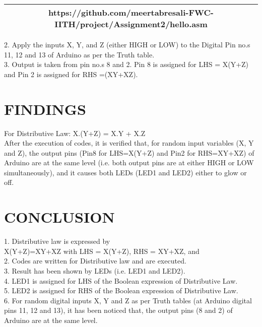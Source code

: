 \documentclass[conference]{IEEEtran}
\begin{document}
\begin{table}[h]
\centering
\begin{tabular}{| c |} \hline
 \rule{0pt}{20pt} https://github.com/meertabresali-FWC-IITH/project/Assignment2/hello.asm\\\hline
\end{tabular}
\end{table}
\begin{flushleft}
2. Apply the inputs X, Y, and Z (either HIGH or LOW) to the Digital Pin no.s 11, 12 and 13 of Arduino as per the Truth table.\\
\vspace{0.4cm}
3. Output is taken from pin no.s 8 and 2. Pin 8 is assigned for LHS = X(Y+Z) and Pin 2 is assigned for RHS =(XY+XZ). 
\end{flushleft}

\section{FINDINGS}
\begin{flushleft}
For Distributive Law: X.(Y+Z) = X.Y + X.Z \\
\vspace{0.3cm}
After the execution of codes, it is verified that, for random input variables (X, Y and Z), the output pins (Pin8 for LHS=X(Y+Z) and Pin2 for RHS=XY+XZ) of Arduino are at the same level (i.e. both output pins are at either HIGH or LOW simultaneously), and it causes both LEDs (LED1 and LED2) either to glow or off.\\

\end{flushleft}
\section{CONCLUSION}
\begin{flushleft}
1. Distributive law is expressed by \\
X(Y+Z)=XY+XZ with LHS = X(Y+Z), RHS = XY+XZ, and \\
2. Codes are written for Distributive law and are executed.\\
3. Result has been shown by LEDs (i.e. LED1 and LED2). \\
4. LED1 is assigned for LHS of the Boolean expression of Distributive Law. \\
5. LED2 is assigned for RHS of the Boolean expression of Distributive Law. \\
6. For random digital inputs X, Y and Z as per Truth tables (at Arduino digital pins 11, 12 and 13), it has been noticed that, the output pins (8 and 2) of Arduino are at the same level.
\end{flushleft}
\end{document}
